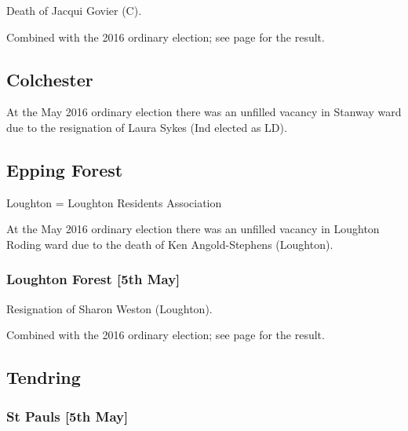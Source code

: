 \documentclass[a4paper,openany]{book}
\begin{document}
\begin{resultsiii}

Death of Jacqui Govier (C).

Combined with the 2016 ordinary election; see page \pageref{StGeorgesCastlePoint} for the result.

\subsection*{Colchester}

At the May 2016 ordinary election there was an unfilled vacancy in Stanway ward due to the resignation of Laura Sykes (Ind elected as LD).

\subsection*{Epping Forest}

Loughton = Loughton Residents Association

At the May 2016 ordinary election there was an unfilled vacancy in Loughton Roding ward due to the death of Ken Angold-Stephens (Loughton).

\subsubsection*{Loughton Forest \hspace*{\fill}\nolinebreak[1]%
\enspace\hspace*{\fill}
[5th May]}


Resignation of Sharon Weston (Loughton).

Combined with the 2016 ordinary election; see page \pageref{LoughtonForestEppingForest} for the result.

\subsection*{Tendring}

\subsubsection*{St Pauls \hspace*{\fill}\nolinebreak[1]%
\enspace\hspace*{\fill}
[5th May]}


\end{resultsiii}
\end{document}
